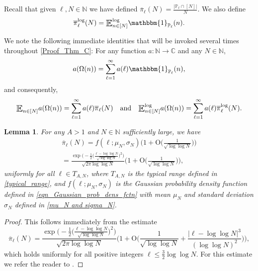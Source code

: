 \documentclass[letter,11pt]{article}
\theoremstyle{plain} %
\newtheorem{lemma}[theorem]{Lemma}
\theoremstyle{definition} %
\theoremstyle{plain}
\theoremstyle{plain}
\theoremstyle{plain}
\numberwithin{equation}{section}
\newcommand{\Oh}{{\mathrm O}}
\newcommand{\N}{\mathbb{N}}
\newcommand{\C}{\mathbb{C}}
\renewcommand{\leq}{\leqslant}
\renewcommand{\P}{\mathbb{P}}
\newcommand{\E}{\raisebox{-0.4ex}{\scalebox{1.4}[1.3]{$\mathbb{E}$}}}
\newcommand{\Esub}[1]{\raisebox{-0.4ex}{\scalebox{1.4}[1.3]{$\mathbb{E}$}}\raisebox{-0.35ex}{\ensuremath{_{\scriptstyle #1}}}}
\newcommand{\logE}{{\E}^{\log}}
\newcommand{\1}{\mathbbm{1}}
\begin{document}
Recall that given $\ell,N\in\N$ we have defined $\overline{\pi}_\ell(N) = \frac{|\P_\ell\cap [N]|}{N}$. We also define
$$\overline{\pi}^{\log}_\ell(N) = \logE_{n\in[N]}\1_{\P_\ell}(n).$$

We note the following immediate identities that will be invoked several times throughout \cref{Proof_Thm_C}: For any function $a\colon\N\to\C$ and any $N\in\N$,
\begin{equation}\label{eqn_expanding_a(Omega(n))_1}
    a(\Omega(n)) = \sum_{\ell=1}^\infty a(\ell)\1_{\P_\ell}(n),
\end{equation}
and consequently,
\begin{equation}\label{eqn_expanding_a(Omega(n))_2}
    \Esub{n\in[N]} a(\Omega(n)) 
    = \sum_{\ell=1}^\infty a(\ell)\overline{\pi}_\ell(N)
    \quad\text{and}\quad
    \logE_{n\in[N]} a(\Omega(n)) 
    = \sum_{\ell=1}^\infty a(\ell)\overline{\pi}^{\log}_\ell(N).
\end{equation}
   
\begin{lemma}\label{pi_k_estimate}
    For any $A>1$ and $N\in\N$ sufficiently large, we have
    \begin{multline*}
        \overline{\pi}_\ell(N) 
        = f(\ell;\mu_N,\sigma_N)\bigg(1 + \Oh\bigg(\frac{1}{\sqrt{\log\log{N}}}\bigg)\bigg) \\
        = \frac{\exp\Big(-\frac{1}{2}\Big(\frac{\ell-\log\log{N}}{\sqrt{\log\log{N}}}\Big)^2\Big)}{\sqrt{2\pi\log\log{N}}}
    \bigg(1 + \Oh\bigg(\frac{1}{\sqrt{\log\log{N}}}\bigg)\bigg),
    \end{multline*}
    uniformly for all $\ell\in T_{A,N}$, where $T_{A,N}$ is the typical range defined in \eqref{typical_range}, and $f(\ell;\mu_N,\sigma_N)$ is the Gaussian probability density function defined in \eqref{eqn_Gaussian_prob_dens_fctn} with mean $\mu_N$ and standard deviation $\sigma_N$ defined in \eqref{mu_N and sigma_N}.
\end{lemma}

\begin{proof}
    This follows immediately from the estimate
    $$\overline{\pi}_\ell(N) = \frac{\exp\Big(-\frac{1}{2}\Big(\frac{\ell-\log\log{N}}{\sqrt{\log\log{N}}}\Big)^2\Big)}{\sqrt{2\pi\log\log{N}}}
    \bigg(1 + \Oh\bigg(\frac{1}{\sqrt{\log\log{N}}} + \frac{|\ell-\log\log{N}|^3}{(\log\log{N})^2}\bigg)\bigg),$$
    which holds uniformly for all positive integers $\ell\leq \frac{3}{2}\log\log{N}$. For this estimate we refer the reader to \cite[p. 236]{MV_book}.
\end{proof}
\end{document}

